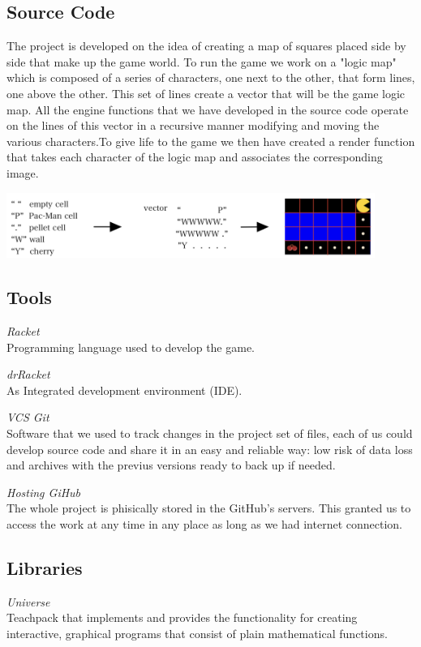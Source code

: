 \documentclass{article}
\begin{document}
 \subsection{Source Code}
 The project is developed on the idea of creating a map of squares placed side by side that make up the game world. To run the game we work on a "logic map" which is composed of a series of characters, one next to the other, that form lines, one above the other. This set of lines create a vector that will be the game logic map. All the engine functions that we have developed in the source code operate on the lines of this vector in a recursive manner modifying and moving the various characters.To give life to the game we then have created a render function that takes each character of the logic map and associates the corresponding image.\\
 
 \begin{center}
 \includegraphics[width=12cm]{./images/vector.jpeg}
 \end{center}

 
 \subsection{Tools}
 
 \hspace{0.5cm}\textit{Racket}\\
 Programming language used to develop the game.

 \textit{drRacket}\\
 As Integrated development environment (IDE).
 
 \textit{VCS Git}\\
Software that we used to track changes in the project set of files, each of us could develop source code and share it in an easy and reliable way: low risk of data loss and archives with the previus versions ready to back up if needed.

 \textit{Hosting GiHub}\\
The whole project is phisically stored in the GitHub's servers. This granted us to access the work at any time in any place as long as we had internet connection.

\subsection{Libraries}
 \hspace{0.5cm}\textit{Universe}\\
 Teachpack that implements and provides the functionality for creating interactive, graphical programs that consist of plain mathematical functions.
 
\end{document}
